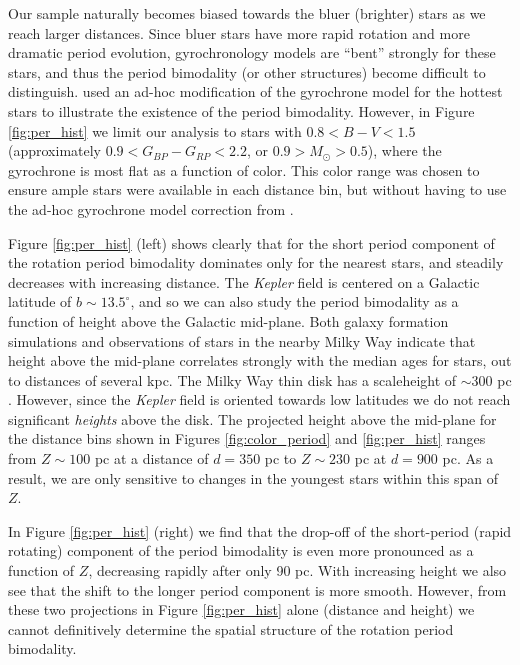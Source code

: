 \documentclass[preprint2]{aastex62}
\newcommand{\Kepler}{\textsl{Kepler}\xspace}
\begin{document}
Our sample naturally becomes biased towards the bluer (brighter) stars as we reach larger distances. Since bluer stars have more rapid rotation and more dramatic period evolution, gyrochronology models are ``bent'' strongly for these stars, and thus the period bimodality (or other structures) become difficult to distinguish. \citet{davenport2017} used an ad-hoc modification of the gyrochrone model for the hottest stars to illustrate the existence of the period bimodality. However, in Figure \ref{fig:per_hist} we limit our analysis to stars with $0.8<B-V<1.5$ (approximately $0.9<G_{BP}-G_{RP}<2.2$, or $0.9>M_\odot> 0.5$), where the gyrochrone is most flat as a function of color. This color range was chosen to ensure ample stars were available in each distance bin, but without having to use the ad-hoc gyrochrone model correction from \citet{davenport2017}.



Figure \ref{fig:per_hist} (left) shows clearly that for the short period component of the rotation period bimodality dominates only for the nearest stars, and steadily decreases with increasing distance.
The \Kepler field is centered on a Galactic latitude of $b\sim13.5^\circ$, and so we can also study the period bimodality as a function of height above the Galactic mid-plane.
Both galaxy formation simulations \citep{ma2017} and observations of stars in the nearby Milky Way \citep{xiang2017} indicate that height above the mid-plane correlates strongly with the median ages for stars, out to distances of several kpc. The Milky Way thin disk has a scaleheight of $\sim$300 pc \citep{gilmore1983}.
However, since the \Kepler field is oriented towards low latitudes we do not reach significant {\it heights} above the disk.
The projected height above the mid-plane for the distance bins shown in Figures \ref{fig:color_period} and \ref{fig:per_hist} ranges from $Z\sim100$ pc at a distance of $d=350$ pc to $Z\sim230$ pc at $d=900$ pc. As a result, we are only sensitive to changes in the youngest stars within this span of $Z$.

In Figure \ref{fig:per_hist} (right) we find that the drop-off of the short-period (rapid rotating) component of the period bimodality is even more pronounced as a function of $Z$, decreasing rapidly after only 90 pc. With increasing height we also see that the shift to the longer period component is more smooth. However, from these two projections in Figure \ref{fig:per_hist} alone (distance and height) we cannot definitively determine the spatial structure of the rotation period bimodality.
\end{document}
